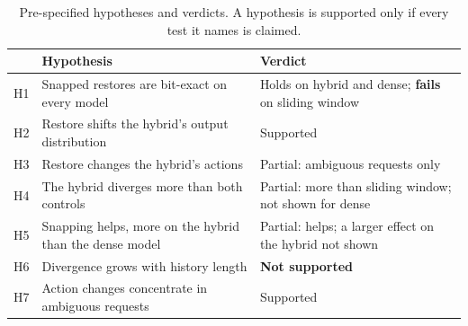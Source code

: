 \begin{table}[t]
\caption{Pre-specified hypotheses and verdicts. A hypothesis is supported only
if every test it names is claimed.}
\label{tab:hypotheses}
\small
\begin{tabular}{@{}l>{\raggedright\arraybackslash}p{}>{\raggedright\arraybackslash}p{}@{}}
\toprule
 & Hypothesis & Verdict \\
\midrule
H1 & Snapped restores are bit-exact on every model & Holds on hybrid and dense; \textbf{fails} on sliding window \\
H2 & Restore shifts the hybrid's output distribution & Supported \\
H3 & Restore changes the hybrid's actions & Partial: ambiguous requests only \\
H4 & The hybrid diverges more than both controls & Partial: more than sliding window; not shown for dense \\
H5 & Snapping helps, more on the hybrid than the dense model & Partial: helps; a larger effect on the hybrid not shown \\
H6 & Divergence grows with history length & \textbf{Not supported} \\
H7 & Action changes concentrate in ambiguous requests & Supported \\
\bottomrule
\end{tabular}
\end{table}
